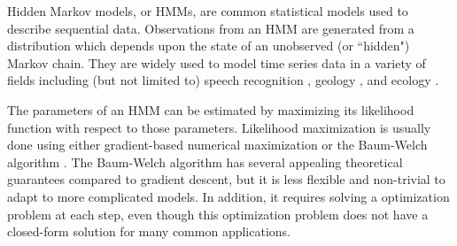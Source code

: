 

Hidden Markov models, or HMMs, are common statistical models used to describe sequential data. Observations from an HMM are generated from a distribution which depends upon the state of an unobserved (or ``hidden") Markov chain. They are widely used to model time series data in a variety of fields including (but not limited to) speech recognition \citep{Gales:2008}, geology \citep{Bebbington:2007}, and ecology \citep{McClintock:2020}.

The parameters of an HMM can be estimated by maximizing its likelihood function with respect to those parameters. Likelihood maximization is usually done using either gradient-based numerical maximization or the Baum-Welch algorithm \citep{Baum:1970}.
The Baum-Welch algorithm has several appealing theoretical guarantees compared to gradient descent, but it is less flexible and non-trivial to adapt to more complicated models. In addition, it requires solving a optimization problem at each step, even though this optimization problem does not have a closed-form solution for many common applications. %

